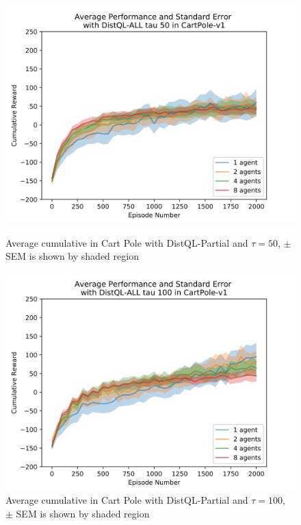 \documentclass[jair,twoside,11pt,theapa]{article}
\begin{document}
\begin{figure}[h]
	\centering
	\begin{minipage}{.4\textwidth}
		\centering
		\includegraphics[width=1\linewidth]{resultImages/binned-Average-Performance-and-Standard-Error-with-DistQL-ALL-tau-50-in-CartPole-v1}
		\caption{Average cumulative in Cart Pole with DistQL-Partial and $\tau=50$, $\pm$ SEM is shown by shaded region}
		\label{fig:DistQL-ALL-tau-50-env-CartPole-v1}
	\end{minipage}
	\begin{minipage}{.4\textwidth}
		\centering
		\includegraphics[width=1\linewidth]{resultImages/binned-Average-Performance-and-Standard-Error-with-DistQL-ALL-tau-100-in-CartPole-v1}
		\caption{Average cumulative in Cart Pole with DistQL-Partial and $\tau=100$, $\pm$ SEM is shown by shaded region}
		\label{fig:DistQL-ALL-tau-100-env-CartPole-v1}
	\end{minipage}
\end{figure}
\end{document}

